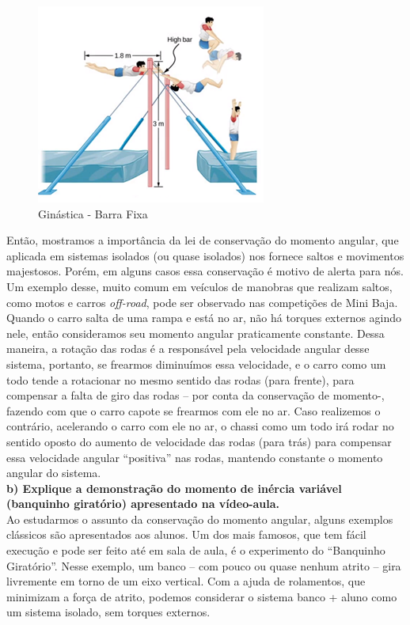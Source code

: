 \begin{figure}[H]
  \centering
  \includegraphics[scale=1.7]{images/i3.png}
  \caption{Ginástica - Barra Fixa }
\end{figure}

Então, mostramos a importância da lei de conservação do momento angular, que aplicada em sistemas isolados (ou quase isolados) nos fornece saltos e movimentos majestosos. Porém, em alguns casos essa conservação é motivo de alerta para nós.\\

Um exemplo desse, muito comum em veículos de manobras que realizam saltos, como motos e carros \textit{off-road}, pode ser observado nas competições de Mini Baja. Quando o carro salta de uma rampa e está no ar, não há torques externos agindo nele, então consideramos seu momento angular praticamente constante. Dessa maneira, a rotação das rodas é a responsável pela velocidade angular desse sistema, portanto, se frearmos diminuímos essa velocidade, e o carro como um todo tende a rotacionar no mesmo sentido das rodas (para frente), para compensar a falta de giro das rodas – por conta da conservação de momento-, fazendo com que o carro capote se frearmos com ele no ar. 
Caso realizemos o contrário, acelerando o carro com ele no ar, o chassi como um todo irá rodar no sentido oposto do aumento de velocidade das rodas (para trás) para compensar essa velocidade angular “positiva” nas rodas, mantendo constante o momento angular do sistema.\\ 

\textbf{b) Explique a demonstração do momento de inércia variável (banquinho giratório) apresentado na vídeo-aula.}\\

Ao estudarmos o assunto da conservação do momento angular, alguns exemplos clássicos são apresentados aos alunos. Um dos mais famosos, que tem fácil execução e pode ser feito até em sala de aula, é o experimento do “Banquinho Giratório”. Nesse exemplo, um banco – com pouco ou quase nenhum atrito – gira livremente em torno de um eixo vertical. Com a ajuda de rolamentos, que minimizam a força de atrito, podemos considerar o sistema banco + aluno como um sistema isolado, sem torques externos.\\

